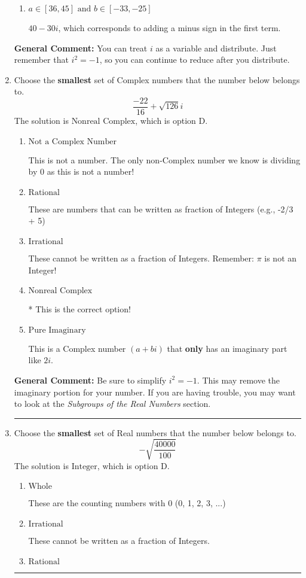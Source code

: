 \documentclass{extbook}[14pt]
\newcommand{\litem}[1]{\item #1

\rule{\textwidth}{0.4pt}}
\begin{document}
\begin{enumerate}
{\begin{enumerate}[label=\Alph*.]
 $0 - 50 i$, which corresponds to adding a minus sign in both terms.
\item \( a \in [36, 45] \text{ and } b \in [-33, -25] \)

 $40 - 30 i$, which corresponds to adding a minus sign in the first term.
\end{enumerate}

\textbf{General Comment:} You can treat $i$ as a variable and distribute. Just remember that $i^2=-1$, so you can continue to reduce after you distribute.
}
\litem{
Choose the \textbf{smallest} set of Complex numbers that the number below belongs to.
\[ \frac{-22}{16}+\sqrt{126} i \]
The solution is \( \text{Nonreal Complex} \), which is option D.\begin{enumerate}[label=\Alph*.]
\item \( \text{Not a Complex Number} \)

This is not a number. The only non-Complex number we know is dividing by 0 as this is not a number!
\item \( \text{Rational} \)

These are numbers that can be written as fraction of Integers (e.g., -2/3 + 5)
\item \( \text{Irrational} \)

These cannot be written as a fraction of Integers. Remember: $\pi$ is not an Integer!
\item \( \text{Nonreal Complex} \)

* This is the correct option!
\item \( \text{Pure Imaginary} \)

This is a Complex number $(a+bi)$ that \textbf{only} has an imaginary part like $2i$.
\end{enumerate}

\textbf{General Comment:} Be sure to simplify $i^2 = -1$. This may remove the imaginary portion for your number. If you are having trouble, you may want to look at the \textit{Subgroups of the Real Numbers} section.
}
\litem{
Choose the \textbf{smallest} set of Real numbers that the number below belongs to.
\[ -\sqrt{\frac{40000}{100}} \]
The solution is \( \text{Integer} \), which is option D.\begin{enumerate}[label=\Alph*.]
\item \( \text{Whole} \)

These are the counting numbers with 0 (0, 1, 2, 3, ...)
\item \( \text{Irrational} \)

These cannot be written as a fraction of Integers.
\item \( \text{Rational} \)


\end{enumerate}}
\end{enumerate}
\end{document}
